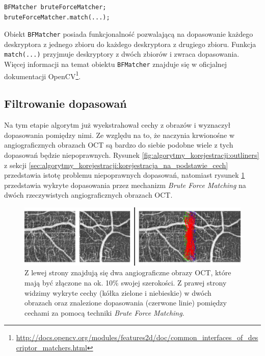 \begin{verbatim}
BFMatcher bruteForceMatcher;
bruteForceMatcher.match(...);
\end{verbatim}

Obiekt \texttt{BFMatcher} posiada funkcjonalność pozwalającą na dopasowanie każdego deskryptora z jednego zbioru do każdego deskryptora z drugiego zbioru. Funkcja \texttt{match(...)} przyjmuje deskryptory z dwóch zbiorów i zwraca dopasowania. Więcej informacji na temat obiektu \texttt{BFMatcher} znajduje się w oficjalnej dokumentacji OpenCV\footnote{\url{http://docs.opencv.org/modules/features2d/doc/common_interfaces_of_descriptor_matchers.html}}.

\subsection{Filtrowanie dopasowań}
\label{sec:proponowane_algorytmy:filtrowanie}

Na tym etapie algorytm już wyekstrahował cechy z obrazów i wyznaczył dopasowania pomiędzy nimi. Ze względu na to, że naczynia krwionośne w angiograficznych obrazach OCT są bardzo do siebie podobne wiele z tych dopasowań będzie niepoprawnych. Rysunek \ref{fig:algorytmy_korejestracji:outliners} z sekcji \ref{sec:algorytmy_korejestracji:korejestracja_na_podstawie_cech} przedstawia istotę problemu niepoprawnych dopasowań, natomiast rysunek \ref{fig:proponowane_algorytmy:no_filtering} przedstawia wykryte dopasowania przez mechanizm \textit{Brute Force Matching} na dwóch rzeczywistych angiograficznych obrazach OCT.

\begin{figure}[H]
  \centering
  \includegraphics[width=\textwidth]{gfx/no_filtering}
  \caption{Z lewej strony znajdują się dwa angiograficzne obrazy OCT, które mają być złączone na ok. 10\% swojej szerokości. Z prawej strony widzimy wykryte cechy (kółka zielone i niebieskie) w dwóch obrazach oraz znalezione dopasowania (czerwone linie) pomiędzy cechami za pomocą techniki \textit{Brute Force Matching}.}
  \label{fig:proponowane_algorytmy:no_filtering}
\end{figure}

